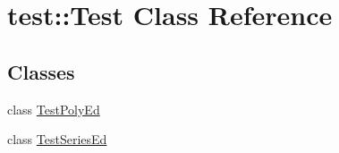 \hypertarget{classtest_1_1_test}{}\section{test\+:\+:Test Class Reference}
\label{classtest_1_1_test}
\subsection*{Classes}
\begin{DoxyCompactItemize}
\item 
class \mbox{\hyperlink{classtest_1_1_test_1_1_test_poly_ed}{Test\+Poly\+Ed}}
\item 
class \mbox{\hyperlink{classtest_1_1_test_1_1_test_series_ed}{Test\+Series\+Ed}}
\end{DoxyCompactItemize}
